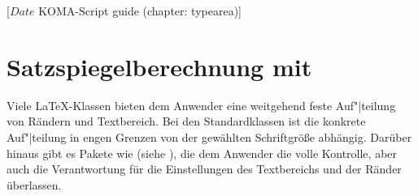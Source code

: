 %
%
%
%
%
%
%
%
% 
%
%
%
%


                 [$Date$
                  KOMA-Script guide (chapter: typearea)]
\chapter{Satzspiegelberechnung mit }

\BeginIndexGroup%
%
Viele \LaTeX-Klassen bieten dem
Anwender eine weitgehend feste Auf"|teilung von Rändern und Textbereich. Bei
den Standardklassen ist die konkrete Auf"|teilung in engen Grenzen von der
gewählten Schriftgröße abhängig. Darüber hinaus gibt es Pakete wie
 (siehe \cite{package:geometry}), die
dem Anwender die volle Kontrolle, aber auch die Verantwortung für die
Einstellungen des Textbereichs und der Ränder überlassen.

